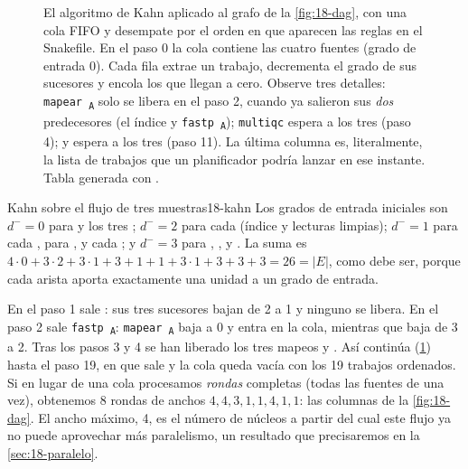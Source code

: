 \begin{figure}[p]
\centering
\small
\renewcommand{\arraystretch}{1.18}

\caption[El algoritmo de Kahn paso a paso]{El algoritmo de Kahn aplicado al grafo de la \cref{fig:18-dag}, con una cola FIFO y desempate por el orden en que aparecen las reglas en el Snakefile. En el paso 0 la cola contiene las cuatro fuentes (grado de entrada 0). Cada fila extrae un trabajo, decrementa el grado de sus sucesores y encola los que llegan a cero. Observe tres detalles: \texttt{mapear\,\textsubscript{A}} solo se libera en el paso 2, cuando ya salieron sus \emph{dos} predecesores (el índice y \texttt{fastp\,\textsubscript{A}}); \texttt{multiqc} espera a los tres  (paso 4); y  espera a los tres  (paso 11). La última columna es, literalmente, la lista de trabajos que un planificador podría lanzar en ese instante. Tabla generada con .}
\label{fig:18-kahn}
\end{figure}

\begin{ejemplo}{Kahn sobre el flujo de tres muestras}{18-kahn}
Los grados de entrada iniciales son $d^-=0$ para  y los tres ; $d^-=2$ para cada  (índice y lecturas limpias); $d^-=1$ para cada , para ,  y cada ; y $d^-=3$ para , ,  y . La suma es $4\cdot 0+3\cdot 2+3\cdot1+3+1+1+3\cdot1+3+3+3=26=|E|$, como debe ser, porque cada arista aporta exactamente una unidad a un grado de entrada.

En el paso 1 sale : sus tres sucesores bajan de 2 a 1 y ninguno se libera. En el paso 2 sale \texttt{fastp\,\textsubscript{A}}: \texttt{mapear\,\textsubscript{A}} baja a 0 y entra en la cola, mientras que  baja de 3 a 2. Tras los pasos 3 y 4 se han liberado los tres mapeos y . Así continúa (\cref{fig:18-kahn}) hasta el paso 19, en que sale  y la cola queda vacía con los 19 trabajos ordenados. Si en lugar de una cola procesamos \emph{rondas} completas (todas las fuentes de una vez), obtenemos 8 rondas de anchos $4,4,3,1,1,4,1,1$: las columnas de la \cref{fig:18-dag}. El ancho máximo, 4, es el número de núcleos a partir del cual este flujo ya no puede aprovechar más paralelismo, un resultado que precisaremos en la \cref{sec:18-paralelo}.
\end{ejemplo}

